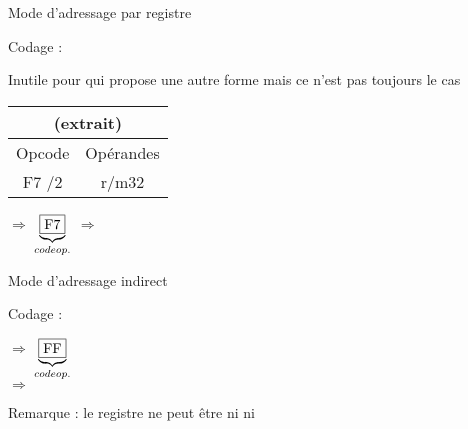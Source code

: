 \documentclass[14pt,xcolor,table]{beamer}
\begin{document}
\begin{frame}[fragile]{Mode d'adressage par registre}

	Codage : \emph{
	}
	
	Inutile pour  qui propose une autre forme mais ce n'est pas toujours le cas

	
	\begin{center}
	\begin{small}
	\begin{tabular}{|c|c|}
		\multicolumn{2}{c}{\asm{NOT} (extrait)}\\\hline
		{\cellcolor{gray!25}Opcode} & {\cellcolor{gray!25}Opérandes} \\\hline
		F7 /2 & r/m32\\\hline
	\end{tabular}
	\end{small}
	\end{center}

	\bigskip
	\quad$\Rightarrow$ 
	$\underbrace{\fbox{F7}}_{code op.}$
	\quad$\Rightarrow$ 
	 
	\bigskip
	
\end{frame}

\begin{frame}[fragile]{Mode d'adressage indirect}

	Codage : \emph{
	}
	
	
	\bigskip
	\quad$\Rightarrow$ 
	$\underbrace{\fbox{FF}}_{code op.}$
	\\\medskip\quad$\Rightarrow$ 
	 
	\bigskip
		
	Remarque : le registre ne peut être ni  ni 
	
\end{frame}
\end{document}
